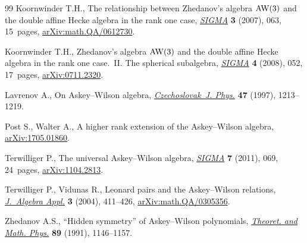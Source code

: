 \documentclass[10pt,a4paper]{amsart}
\numberwithin{equation}{section}
\begin{document}
\begin{thebibliography}{99}
Koornwinder T.H., The relationship between {Z}hedanov's algebra {${\rm AW}(3)$}
 and the double affine {H}ecke algebra in the rank one case, \href{https://doi.org/10.3842/SIGMA.2007.063}{\textit{SIGMA}}
 \textbf{3} (2007), 063, 15~pages, \href{https://arxiv.org/abs/math.QA/0612730}{arXiv:math.QA/0612730}.

Koornwinder T.H., Zhedanov's algebra {$\rm AW(3)$} and the double affine
 {H}ecke algebra in the rank one case.~{II}. {T}he spherical subalgebra,
 \href{https://doi.org/10.3842/SIGMA.2008.052}{\textit{SIGMA}} \textbf{4} (2008), 052, 17~pages, \href{https://arxiv.org/abs/0711.2320}{arXiv:0711.2320}.

Lavrenov A., On {A}skey--{W}ilson algebra, \href{https://doi.org/10.1023/A:1022821531517}{\textit{Czechoslovak~J. Phys.}}
 \textbf{47} (1997), 1213--1219.

Post S., Walter A., A higher rank extension of the {A}skey--{W}ilson algebra,
 \href{https://arxiv.org/abs/1705.01860}{arXiv:1705.01860}.

Terwilliger P., The universal {A}skey--{W}ilson algebra, \href{https://doi.org/10.3842/SIGMA.2011.069}{\textit{SIGMA}}
 \textbf{7} (2011), 069, 24~pages, \href{https://arxiv.org/abs/1104.2813}{arXiv:1104.2813}.

Terwilliger P., Vidunas R., Leonard pairs and the {A}skey--{W}ilson relations,
 \href{https://doi.org/10.1142/S0219498804000940}{\textit{J.~Algebra Appl.}} \textbf{3} (2004), 411--426, \href{https://arxiv.org/abs/math.QA/0305356}{arXiv:math.QA/0305356}.

Zhedanov A.S., ``{H}idden symmetry'' of {A}skey--{W}ilson polynomials,
 \href{https://doi.org/10.1007/BF01015906}{\textit{Theoret. and Math. Phys.}} \textbf{89} (1991), 1146--1157.

\end{thebibliography}
\end{document}
